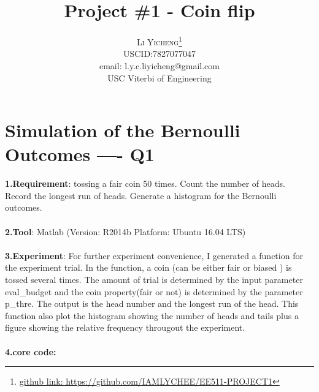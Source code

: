 \documentclass[twoside]{article}
\title{\vspace{-15mm}\fontsize{24pt}{10pt}\selectfont\textbf{Project \#1 - Coin flip }} %
\author{
\large
\textsc{Li Yicheng}\thanks{\href{https://github.com/IAMLYCHEE/EE511-PROJECT1}{github link: https://github.com/IAMLYCHEE/EE511-PROJECT1} }\\[2mm] %
\normalsize USCID:7827077047\\
\normalsize email: l.y.c.liyicheng@gmail.com \\ %
\normalsize USC Viterbi of Engineering
\vspace{-5mm}
}
\date{}
\begin{document}
\maketitle %

\thispagestyle{fancy} %

\section{Simulation of the Bernoulli Outcomes ---- Q1}
\textbf{1.Requirement}: tossing a fair coin 50 times. Count the number of heads. Record the longest run of heads. Generate a histogram for the Bernoulli outcomes.\\ \\
\textbf{2.Tool}: Matlab (Version: R2014b Platform: Ubuntu 16.04 LTS)\\ \\
\textbf{3.Experiment}: For further experiment convenience, I generated a function for the experiment trial. In the function, a coin (can be either fair or biased ) is tossed several times. The amount of trial is determined by the input parameter eval\_budget and the coin property(fair or not) is determined by the parameter p\_thre. The output is the head number and the longest run of the head. This function also plot the histogram showing the number of heads and tails plus a figure showing the relative frequency througout the experiment. \\ \\
\textbf{4.core code:}
\end{document}
